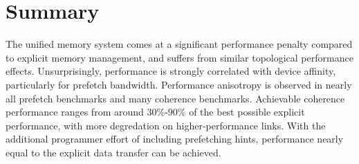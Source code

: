 \section{Summary}

The unified memory system comes at a significant performance penalty compared to explicit memory management, and suffers from similar topological performance effects.
Unsurprisingly, performance is strongly correlated with device affinity, particularly for prefetch bandwidth.
Performance anisotropy is observed in nearly all prefetch benchmarks and many coherence benchmarks.
Achievable coherence performance ranges from around $30\%$-$90\%$ of the best possible explicit performance, with more degredation on higher-performance links.
With the additional programmer effort of including prefetching hints, performance nearly equal to the explicit data transfer can be achieved.